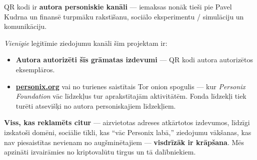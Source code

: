\begin{minipage}[t]{0.60\textwidth}
\vspace{0pt}
\begin{mdframed}[
  linewidth=0.7pt,roundcorner=5pt,
  innerleftmargin=10pt,innerrightmargin=10pt,
  innertopmargin=8pt,innerbottommargin=8pt,
  skipabove=0pt,skipbelow=0pt,
  linecolor=cbwarning!50,backgroundcolor=cbwarning!5,
  nobreak=true,
  needspace=4\baselineskip,
]
\footnotesize
QR kodi ir \textbf{autora personiskie kanāli} --- iemaksas nonāk tieši pie Pavel Kudrna un finansē turpmāku rakstīšanu, sociālo eksperimentu / simulāciju un komunikāciju.

\smallskip
\emph{Vienīgie} leģitīmie ziedojumu kanāli šim projektam ir:

\smallskip
\begin{itemize}
\setlength{\itemsep}{0pt}
\setlength{\topsep}{0pt}
\item \textbf{Autora autorizēti šīs grāmatas izdevumi} --- QR kodi autora autorizētos eksemplāros.
\item \href{https://personix.org}{\textbf{personix.org}} vai no turienes saistītais Tor onion spogulis --- kur \emph{Personix Foundation} vāc līdzekļus tur aprakstītajām aktivitātēm. Fonda līdzekļi tiek turēti atsevišķi no autora personiskajiem līdzekļiem.
\end{itemize}

\smallskip
\textbf{Viss, kas reklamēts citur} --- aizvietotas adreses atkārtotos izdevumos, līdzīgi izskatoši domēni, sociālie tīkli, kas ``vāc Personix labā,'' ziedojumu vākšanas, kas nav piesaistītas nevienam no augšminētajiem --- \textbf{visdrīzāk ir krāpšana}. Mēs apzināti izvairāmies no kriptovalūtu tirgus un tā dalībniekiem.
\end{mdframed}
\end{minipage}

\clearpage
